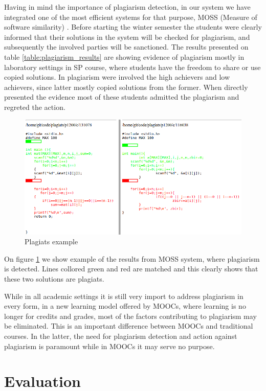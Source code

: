 \documentclass{llncs}
\begin{document}
Having in mind the importance of plagiarism detection, in our system we have
integrated one of the most efficient systems for that purpose, MOSS (Measure of
software similarity) \cite{aiken1994measure}. Before starting the winter semester the
students were clearly informed that their solutions in the system will be
checked for plagiarism, and subsequently the involved parties will be
sanctioned. The results presented on table \ref{table:plagiarism_results} are
showing evidence of plagiarism mostly in laboratory settings in SP course, where
students have the freedom to share or use copied solutions. In plagiarism
were involved the high achievers and low achievers, since latter mostly copied
solutions from the former. When directly presented the evidence most of these
students admitted the plagiarism and regreted the action.

\begin{figure}
\centering
\includegraphics[width=.99\textwidth]{code_usage/plagiat_example}
\caption{Plagiats example}
\label{fig:plagiats_example}
\end{figure}

On figure \ref{fig:plagiats_example} we show example of the results from MOSS
system, where plagiarism is detected. Lines collored green and red are matched
and this clearly shows that these two solutions are plagiats.

While in all academic settings it is still very import to address plagiarism in
every form, in a new learning model offered by MOOCs, where learning is no
longer for credits and grades, most of the factors contributing to plagiarism
may be eliminated. This is an important difference between MOOCs and traditional
courses. In the latter, the need for plagiarism detection and action against
plagiarism is paramount while in MOOCs it may serve no purpose.

\section{Evaluation}
\end{document}
